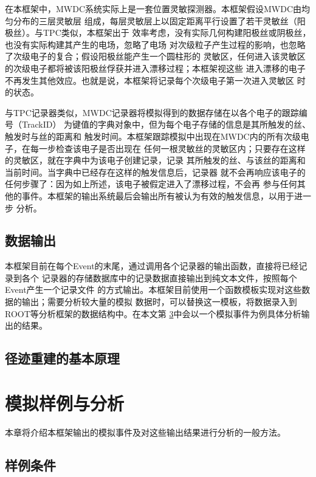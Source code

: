 \documentclass[bachelor,openany,oneside,color]{buaathesis}
\begin{document}
在本框架中，MWDC系统实际上是一套位置灵敏探测器。本框架假设MWDC由均匀分布的三层灵敏层
组成，每层灵敏层上以固定距离平行设置了若干灵敏丝（阳极丝）。与TPC类似，本框架出于
效率考虑，没有实际几何构建阳极丝或阴极丝，也没有实际构建其产生的电场，忽略了电场
对次级粒子产生过程的影响，也忽略了次级电子的复合；假设阳极丝能产生一个圆柱形的
灵敏区，任何进入该灵敏区的次级电子都将被该阳极丝俘获并进入漂移过程；本框架视这些
进入漂移的电子不再发生其他效应。也就是说，本框架将记录每个次级电子第一次进入灵敏区
时的状态。

与TPC记录器类似，MWDC记录器将模拟得到的数据存储在以各个电子的跟踪编号（TrackID）
为键值的字典对象中，但为每个电子存储的信息是其所触发的丝、触发时与丝的距离和
触发时间。本框架跟踪模拟中出现在MWDC内的所有次级电子，在每一步检查该电子是否出现在
任何一根灵敏丝的灵敏区内；只要存在这样的灵敏区，就在字典中为该电子创建记录，记录
其所触发的丝、与该丝的距离和当前时间。当字典中已经存在这样的触发信息后，记录器
就不会再响应该电子的任何步骤了：因为如上所述，该电子被假定进入了漂移过程，不会再
参与任何其他的事件。本框架的输出系统最后会输出所有被认为有效的触发信息，以用于进一步
分析。

\section{数据输出}

本框架目前在每个Event的末尾，通过调用各个记录器的输出函数，直接将已经记录到各个
记录器的存储数据库中的记录数据直接输出到纯文本文件，按照每个Event产生一个记录文件
的方式输出。本框架目前使用一个函数模板实现对这些数据的输出；需要分析较大量的模拟
数据时，可以替换这一模板，将数据录入到ROOT等分析框架的数据结构中。在本文第
\ref{chap:例子}中会以一个模拟事件为例具体分析输出的结果。

\section{径迹重建的基本原理}%


\chapter{模拟样例与分析}\label{chap:例子}

本章将介绍本框架输出的模拟事件及对这些输出结果进行分析的一般方法。

\section{样例条件}
\end{document}
